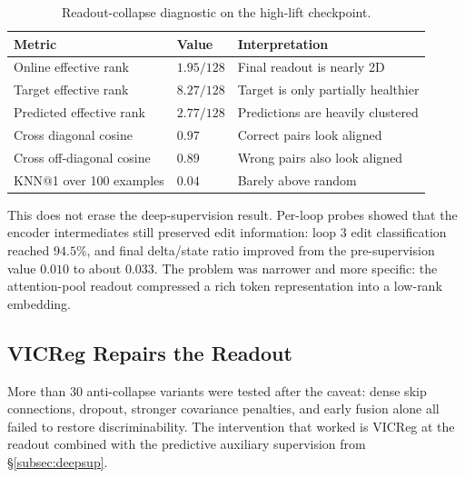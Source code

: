 \begin{table}[t]
\centering
\caption{Readout-collapse diagnostic on the high-lift
 checkpoint.}
\label{tab:readout_collapse}
\smallskip
\begin{tabular}{lll}
\toprule
Metric & Value & Interpretation \\
\midrule
Online effective rank & $1.95/128$ & Final readout is nearly 2D \\
Target effective rank & $8.27/128$ & Target is only partially healthier \\
Predicted effective rank & $2.77/128$ & Predictions are heavily clustered \\
Cross diagonal cosine & $0.97$ & Correct pairs look aligned \\
Cross off-diagonal cosine & $0.89$ & Wrong pairs also look aligned \\
KNN@1 over 100 examples & $0.04$ & Barely above random \\
\bottomrule
\end{tabular}
\end{table}

This does not erase the deep-supervision result.  Per-loop probes showed
that the encoder intermediates still preserved edit information: loop 3
edit classification reached $94.5\%$, and final delta/state ratio
improved from the pre-supervision value $0.010$ to about $0.033$.  The problem
was narrower and more specific: the attention-pool readout compressed a
rich token representation into a low-rank embedding.

\subsection{VICReg Repairs the Readout}
\label{subsec:vicreg}

More than 30 anti-collapse variants were tested after the caveat:
dense skip connections, dropout, stronger covariance penalties, and
early fusion alone all failed to restore discriminability.  The
intervention that worked is VICReg at the readout combined with the
predictive auxiliary supervision from \S\ref{subsec:deepsup}.

